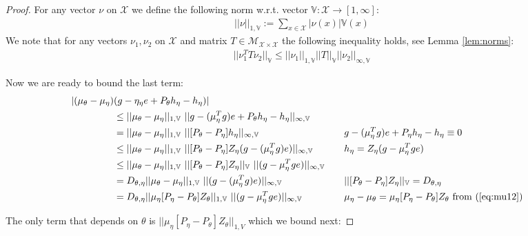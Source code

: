 \documentclass[11pt]{article}
\newcommand{\X}{\mathcal{X}}
\newcommand{\M}{\mathcal{M}}
\newcommand{\V}{\mathbb{V}}
\theoremstyle{definition}
\numberwithin{equation}{section}
\begin{document}
\begin{proof}
For any vector $\nu$ on $\X$ we define  the following norm w.r.t.  vector $\V:\X\rightarrow [1, \infty]$:  
 \begin{align*}
||\nu||_{1, \V}:=\sum\limits_{x\in \X} |\nu(x)|\V(x)
\end{align*}
We note that for any vectors $\nu_1, \nu_2$ on $\X$ and matrix $T\in \M_{\X\times \X}$ the following inequality holds, see Lemma \ref{lem:norms}:
\begin{align*}
||\nu_1^T T \nu_2||_\V\leq ||\nu_1||_{1, \V}||T||_\V|| \nu_2 ||_{\infty, \V}
\end{align*}
 
Now we are ready to bound the last term:
\begin{equation*} 
\begin{aligned}[c]
 |(\mu_{\theta} - \mu_{\eta}) & (g - \eta_{\eta}e +P_\theta h_{\eta}  - h_{\eta} )|\\
 &\leq ||\mu_{\theta} - \mu_{\eta}  ||_{1, \V}~ ||g - (\mu_{\eta}^T g)e +P_\theta h_{\eta}  - h_{\eta} ||_{\infty, \V}  \\
 &=||\mu_{\theta} - \mu_{\eta}  ||_{1, \V}~||[ P_\theta - P_{\eta}] h_{\eta}  ||_{\infty, \V}& \quad & g - (\mu_{\eta}^T g)e +P_{\eta} h_{\eta}  - h_{\eta} \equiv 0 \\
 &\leq ||\mu_{\theta} - \mu_{\eta}  ||_{1, \V}~|| [P_\theta - P_{\eta}] Z_{\eta} (g - (\mu_{\eta}^T g)e)  ||_{\infty, \V} & \quad &h_{\eta} = Z_{\eta} (g - \mu_\eta^Tg e) \\
 &\leq  ||\mu_{\theta} - \mu_{\eta}  ||_{1, \V}~|| [P_\theta - P_{\eta}] Z_{\eta}||_\V~ || (g - \mu_\eta^Tg e)  ||_{\infty, \V}\\
 &=  D_{\theta, \eta}  ||\mu_{\theta} - \mu_{\eta}  ||_{1, \V}~|| (g -(\mu_{\eta}^T g) e)  ||_{\infty, \V}   & \quad &   ||  [P_{\theta} - P_{\eta}] Z_{\eta}||_\V =  D_{\theta, \eta} \\
 &  =  D_{\theta, \eta} || \mu_{\eta}[P_{\eta} - P_{\theta}] Z_\theta ||_{1, \V}~|| (g - \mu_\eta^Tg e)  ||_{\infty, \V}   & \quad &    \mu_{\eta} - \mu_{\theta}  =  \mu_{\eta}[P_{\eta} - P_{\theta}] Z_\theta~\text{from }(\ref{eq:mu12}) \\
\end{aligned}
 \end{equation*}
     
   
     
    The only term that depends on $\theta$ is $|| \mu_{\eta}[P_{\eta} - P_{\theta}] Z_\theta ||_{1, V}$ which we bound next:
      

\end{proof}
\end{document}
